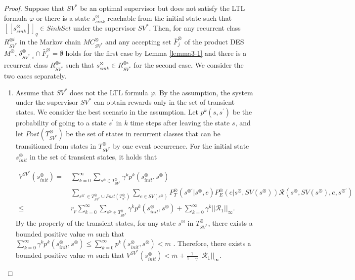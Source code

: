 \documentclass[10pt]{article}
\theoremstyle{definition}
\newcommand{\myspqsink}{\ensuremath{[\![s^{\otimes}_{sink}]\!]}_q}
\begin{document}
\begin{proof}
  Suppose that $SV^{\ast}$ be an optimal supervisor but does not satisfy the LTL formula $\varphi$ or there is  a state $s^{\otimes}_{sink}$ reachable from the initial state such that $\myspqsink \in SinkSet$ under the supervisor $SV^{\ast}$. Then, for any recurrent class $R^{\otimes i}_{{SV}^{\ast}}$ in the Markov chain $MC^{\otimes}_{{SV}^{\ast}}$ and any accepting set $\bar{F}^{\otimes}_j$ of the product DES $M^{\otimes}$,  $\delta^{\otimes}_{SV^{\ast},i} \cap \bar{F}^{\otimes}_j = \emptyset$
  holds for the first case by Lemma \ref{lemma3-1} and there is a recurrent class $R^{\otimes i}_{SV^{\ast}}$ such that $s^{\otimes}_{sink} \in R^{\otimes i}_{SV^{\ast}}$ for the second case. We consider the two cases separately.

 \begin{enumerate}
  \item Assume that $SV^{\ast}$ does not the LTL formula $\varphi$.
  By the assumption, the system under the supervisor $SV^{\ast}$ can obtain rewards only in the set of transient states. We consider the best scenario in the assumption. Let $p^k(s,s^{\prime})$ be the probability of going to a state $s^{\prime}$ in $k$ time steps after leaving the state $s$, and let $Post(T^{\otimes}_{SV^{\ast}})$ be the set of states in recurrent classes that can be transitioned from states in $T^{\otimes}_{SV^{\ast}}$ by one event occurrence. For the initial state $s^{\otimes}_{init}$ in the set of transient states, it holds that

  \begin{align}
    V^{SV^{\ast}}\!(s^{\otimes}_{init})
     =\ & \sum_{k=0}^{\infty} \sum_{s^{\otimes} \in T^{\otimes}_{SV^{\ast}}} \gamma^k p^k(s^{\otimes}_{init}, s^{\otimes}) \nonumber \\
     & \sum_{s^{\otimes \prime} \in T^{\otimes}_{SV^{\ast}} \cup Post(T^{\otimes}_{\pi^{\ast}})}  \sum_{e \in SV(s^{\otimes})} P^{\otimes}_T (s^{\otimes \prime} | s^{\otimes}, e) P^{\otimes}_E (e | s^{\otimes}, SV(s^{\otimes})) \mathcal{R}(s^{\otimes}, SV(s^{\otimes}), e, s^{\otimes \prime})\nonumber \\
     \leq\ & r_p \sum_{k=0}^{\infty} \sum_{s^{\otimes} \in T^{\otimes}_{SV^{\ast}}} \gamma^k p^k(s^{\otimes}_{init}, s^{\otimes}) + \sum_{k=0}^{\infty} \gamma^k ||\mathcal{R}_1||_{\infty}. \nonumber
  \label{eqth11}
  \end{align}
  By the property of the transient states, for any state $s^{\otimes}$ in $T^{\otimes}_{SV^{\ast}}$, there exists a bounded positive value $m$ such that $ \sum_{k=0}^{\infty} \gamma^k p^k(s^{\otimes}_{init}, s^{\otimes}) \leq \sum_{k=0}^{\infty} p^k(s^{\otimes}_{init}, s^{\otimes}) < m$ \cite{ESS}. Therefore, there exists a bounded positive value $\bar{m}$ such that $V^{SV^{\ast}}(s^{\otimes}_{init}) < \bar{m} + \frac{1}{1-\gamma} ||\mathcal{R}_1||_{\infty}$.


\end{enumerate}
\end{proof}
\end{document}
